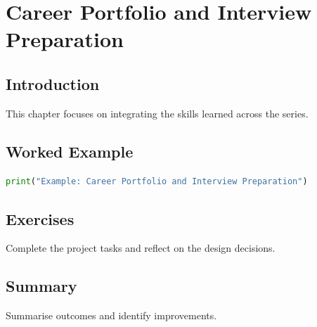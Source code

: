 \chapter{Career Portfolio and Interview Preparation}
\label{chap:vol11-5}
\section{Introduction}
This chapter focuses on integrating the skills learned across the series.
\section{Worked Example}
\begin{lstlisting}[language=Python]
print("Example: Career Portfolio and Interview Preparation")
\end{lstlisting}
\section{Exercises}
\begin{exercise}
Complete the project tasks and reflect on the design decisions.
\end{exercise}
\section{Summary}
Summarise outcomes and identify improvements.
